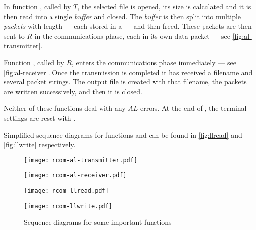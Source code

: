 \documentclass[main.tex]{subfiles}
\begin{document}
In function , called by $T$, the selected file is opened, its size is calculated and it is then read into a single \emph{buffer} and closed. The \emph{buffer} is then split into multiple \emph{packets} with length  --- each stored in a  --- and then freed. These packets are then sent to $R$ in the communications phase, each in its own data packet --- see \autoref{fig:al-transmitter}.

Function , called by $R$, enters the communications phase immediately --- see \autoref{fig:al-receiver}. Once the transmission is completed it has received a filename and several packet strings. The output file is created with that filename, the packets are written successively, and then it is closed.

Neither of these functions deal with any $AL$ errors. At the end of , the terminal settings are reset with .

Simplified sequence diagrams for functions  and  can be found in \autoref{fig:llread} and \autoref{fig:llwrite} respectively.

\begin{figure}[ph]
\caption{Sequence diagrams for some important functions\label{fig:seqdiagrams}}
	
\begin{minipage}{0.5\textwidth}
	\centering
	\texttt{[image: rcom-al-transmitter.pdf]}
\end{minipage}
\begin{minipage}{0.5\textwidth}
	\centering
	\texttt{[image: rcom-al-receiver.pdf]}
\end{minipage}
\begin{minipage}{0.5\textwidth}
	\centering
	\texttt{[image: rcom-llread.pdf]}
\end{minipage}
\begin{minipage}{0.5\textwidth}
	\centering
	\texttt{[image: rcom-llwrite.pdf]}
\end{minipage}
\end{figure}
\end{document}
